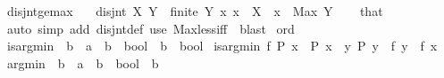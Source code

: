 \begin{isabellebody}
\isamarkupfalse%
%
\endisatagproof
{\isafoldproof}%
%
\isadelimproof
\isanewline
%
\endisadelimproof
\isanewline
{}\isamarkupfalse%
\isanewline
\isanewline
{}\isamarkupfalse%
\ disjnt{\isacharunderscore}{\kern0pt}ge{\isacharunderscore}{\kern0pt}max{\isacharcolon}{\kern0pt}\ \isanewline
\ \ {\isacartoucheopen}disjnt\ X\ Y{\isacartoucheclose}\ \ {\isacartoucheopen}finite\ Y{\isacartoucheclose}\ {\isacartoucheopen}{\isasymAnd}x{\isachardot}{\kern0pt}\ x\ {\isasymin}\ X\ {\isasymLongrightarrow}\ x\ {\isachargreater}{\kern0pt}\ Max\ Y{\isacartoucheclose}\isanewline
%
\isadelimproof
\ \ %
\endisadelimproof
%
\isatagproof
{}\isamarkupfalse%
\ that\ \isamarkupfalse%
\ {\isacharparenleft}{\kern0pt}auto\ simp\ add{\isacharcolon}{\kern0pt}\ disjnt{\isacharunderscore}{\kern0pt}def{\isacharparenright}{\kern0pt}\ {\isacharparenleft}{\kern0pt}use\ Max{\isacharunderscore}{\kern0pt}less{\isacharunderscore}{\kern0pt}iff\ \ blast{\isacharparenright}{\kern0pt}%
\endisatagproof
{\isafoldproof}%
%
\isadelimproof
%
\endisadelimproof
%
\isadelimdocument
%
\endisadelimdocument
%
\isatagdocument
%
\isamarkuptrue%
%
\endisatagdocument
{\isafolddocument}%
%
\isadelimdocument
%
\endisadelimdocument
{}\isamarkupfalse%
\ ord\isanewline
{}\isanewline
\isanewline
{}\isamarkupfalse%
\ is{\isacharunderscore}{\kern0pt}arg{\isacharunderscore}{\kern0pt}min\ {\isacharcolon}{\kern0pt}{\isacharcolon}{\kern0pt}\ {\isachardoublequoteopen}{\isacharparenleft}{\kern0pt}{\isacharprime}{\kern0pt}b\ {\isasymRightarrow}\ {\isacharprime}{\kern0pt}a{\isacharparenright}{\kern0pt}\ {\isasymRightarrow}\ {\isacharparenleft}{\kern0pt}{\isacharprime}{\kern0pt}b\ {\isasymRightarrow}\ bool{\isacharparenright}{\kern0pt}\ {\isasymRightarrow}\ {\isacharprime}{\kern0pt}b\ {\isasymRightarrow}\ bool{\isachardoublequoteclose}\ \isanewline
{\isachardoublequoteopen}is{\isacharunderscore}{\kern0pt}arg{\isacharunderscore}{\kern0pt}min\ f\ P\ x\ {\isacharequal}{\kern0pt}\ {\isacharparenleft}{\kern0pt}P\ x\ {\isasymand}\ {\isasymnot}{\isacharparenleft}{\kern0pt}{\isasymexists}y{\isachardot}{\kern0pt}\ P\ y\ {\isasymand}\ f\ y\ {\isacharless}{\kern0pt}\ f\ x{\isacharparenright}{\kern0pt}{\isacharparenright}{\kern0pt}{\isachardoublequoteclose}\isanewline
\isanewline
{}\isamarkupfalse%
\ arg{\isacharunderscore}{\kern0pt}min\ {\isacharcolon}{\kern0pt}{\isacharcolon}{\kern0pt}\ {\isachardoublequoteopen}{\isacharparenleft}{\kern0pt}{\isacharprime}{\kern0pt}b\ {\isasymRightarrow}\ {\isacharprime}{\kern0pt}a{\isacharparenright}{\kern0pt}\ {\isasymRightarrow}\ {\isacharparenleft}{\kern0pt}{\isacharprime}{\kern0pt}b\ {\isasymRightarrow}\ bool{\isacharparenright}{\kern0pt}\ {\isasymRightarrow}\ {\isacharprime}{\kern0pt}b{\isachardoublequoteclose}\ \isanewline

\end{isabellebody}
